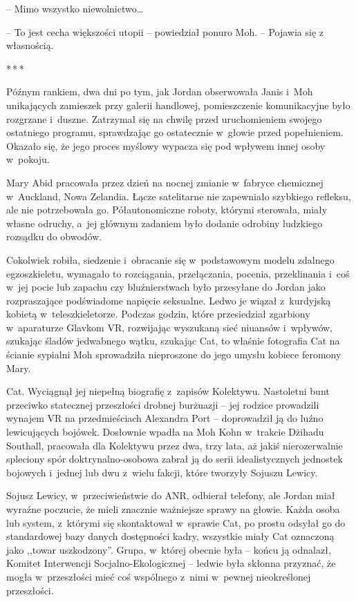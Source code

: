 \documentclass[oneside,polish,11pt,sfheadings]{mwbk}
\newcommand{\threeast}{\bigskip\par\centerline{*\,*\,*}\medskip\par}%
\begin{document}
-- Mimo wszyst\-ko niewolnictwo\ldots

-- To jest cecha większości utopii -- powiedział ponuro Moh. -- Pojawia się
z własnością.
  \threeast 

Późnym rankiem, dwa dni po tym, jak Jordan obserwowała Janis i~Moh
unikających zamieszek przy galerii handlowej, pomieszczenie
komunikacyjne było rozgrzane i~duszne. Zatrzymał się na chwilę przed
uruchomieniem swojego ostatniego programu, sprawdzając go ostatecznie w~głowie przed popełnieniem. Okazało się, że jego proces myślowy wypacza
się pod wpływem innej osoby w~pokoju.

Mary Abid pracowała przez dzień na nocnej zmianie w~fabryce chemicznej w~Auckland, Nowa Zelandia. Łącze satelitarne nie zapewniało szybkiego
refleksu, ale nie potrzebowała go. Półautonomiczne roboty, którymi
sterowała, miały własne odruchy, a~jej głównym zadaniem było dodanie
odrobiny ludzkiego rozsądku do obwodów.

Cokolwiek robiła, siedzenie i~obracanie się w~podstawowym modelu
zdalnego egzoszkieletu, wymagało to rozciągania, przełączania, pocenia,
przeklinania i~coś w~jej pocie lub zapachu czy bluźnierstwach było
przesyłane do Jordan jako rozpraszające podświadome napięcie seksualne.
Ledwo je wiązał z~kurdyjską kobietą w~teleszkieletorze. Podczas godzin,
które przesiedział zgarbiony w~aparaturze Glavkom VR, rozwijając
wyszukaną sieć niuansów i~wpływów, szukając śladów jedwabnego wątku,
szukając Cat, to właśnie fotografia Cat na ścianie sypialni Moh
sprowadziła nieproszone do jego umysłu kobiece feromony Mary.

Cat. Wyciągnął jej niepełną biografię z~zapisów Kolektywu. Nastoletni
bunt przeciwko statecznej przeszłości drobnej burżuazji -- jej rodzice
prowadzili wynajem VR na przedmieściach Alexandra Port -- doprowadził ją
do luźno lewicujących bojówek. Dosłownie wpadła na Moh Kohn w~trakcie
Dżihadu Southall, pracowała dla Kolektywu przez dwa, trzy lata, aż jakiś
nierozerwalnie spleciony spór doktrynalno-osobowa zabrał ją do serii
idealistycznych jednostek bojowych i~jednej lub dwu z~wielu fakcji,
które tworzyły Sojuszu Lewicy.

Sojusz Lewicy, w~przeciwieństwie do ANR, odbierał telefony, ale Jordan
miał wyraźne poczucie, że mieli znacznie ważniejsze sprawy na głowie.
Każda osoba lub system, z~którymi się skontaktował w~sprawie Cat, po
prostu odsyłał go do standardowej bazy danych dostępności kadry,
wszystkie miały Cat oznaczoną jako ,,towar uszkodzony''. Grupa, w~której
obecnie była -- końcu ją odnalazł, Komitet Interwencji
Socjalno-Ekologicznej -- ledwie była skłonna przyznać, że mogła w~przeszłości mieć coś wspólnego z~nimi w~pewnej nieokreślonej
przeszłości.
\end{document}
